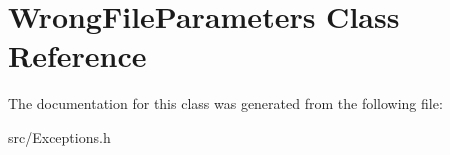 \hypertarget{class_wrong_file_parameters}{}\section{Wrong\+File\+Parameters Class Reference}
\label{class_wrong_file_parameters}


The documentation for this class was generated from the following file\+:\begin{DoxyCompactItemize}
\item 
src/Exceptions.\+h\end{DoxyCompactItemize}
